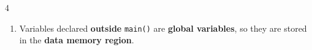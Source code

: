 \documentclass[10pt, landscape]{article}
\begin{document}
\begin{multicols}{4}
\begin{enumerate}
    \item Variables declared \textbf{outside} \texttt{main()} are \textbf{global variables}, so they are stored in the \textbf{data memory region}.

\end{enumerate}
\end{multicols}
\end{document}
